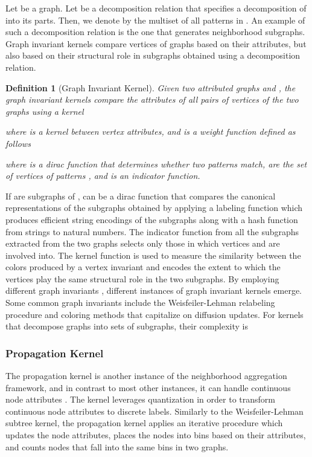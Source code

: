 \documentclass[twoside,11pt]{article}
\newtheorem{definition}{Definition}
\begin{document}
Let  be a graph.
Let  be a decomposition relation that specifies a decomposition of  into its parts.
Then, we denote by  the multiset of all patterns in .
An example of such a decomposition relation is the one that generates neighborhood subgraphs.
Graph invariant kernels compare vertices of graphs based on their attributes, but also based on their  structural role in subgraphs obtained using a decomposition relation.
\begin{definition}[Graph Invariant Kernel]
  Given two attributed graphs  and , the graph invariant kernels compare the attributes of all pairs of vertices of the two graphs using a kernel
  
  where  is a kernel between vertex attributes, and  is a weight function defined as follows
  
  where  is a dirac function that determines whether two patterns match,  are the set of vertices of patterns , and  is an indicator function. 
\end{definition}
If  are subgraphs of ,  can be a dirac function that compares the canonical representations of the subgraphs obtained by applying a labeling function which produces efficient string encodings of the subgraphs along with a hash function from strings to natural numbers.  
The indicator function  from all the subgraphs extracted from the two graphs selects only those in which vertices  and  are involved into.
The kernel function  is used to measure the similarity between the colors produced by a vertex invariant  and encodes the extent to which the vertices play the same structural role in the two subgraphs.
By employing different graph invariants , different instances of graph invariant kernels emerge.
Some common graph invariants include the Weisfeiler-Lehman relabeling procedure and coloring methods that capitalize on diffusion updates.
For kernels that decompose graphs into sets of subgraphs, their complexity is 

\subsubsection{Propagation Kernel}
The propagation kernel is another instance of the neighborhood aggregation framework, and in contrast to most other instances, it can handle continuous node attributes \cite{neumann2016propagation}.
The kernel leverages quantization in order to transform continuous node attributes to discrete labels.
Similarly to the Weisfeiler-Lehman subtree kernel, the propagation kernel applies an iterative procedure which updates the node attributes, places the nodes into bins based on their attributes, and counts nodes that fall into the same bins in two graphs. 
\end{document}
